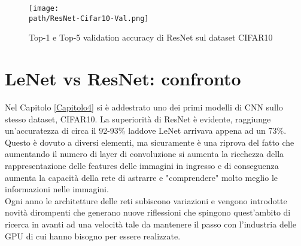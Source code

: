 \begin{figure}[h!]
 \centering
 \texttt{[image: \\path/ResNet-Cifar10-Val.png]} 
 \caption{Top-1 e Top-5 validation accuracy di ResNet sul dataset CIFAR10}
 \label{fig:res-val}
\end{figure}

\section{LeNet vs ResNet: confronto}
Nel Capitolo \ref{Capitolo4} si è addestrato uno dei primi modelli di CNN sullo stesso dataset, CIFAR10. La superiorità di ResNet è evidente, raggiunge un'accuratezza di circa il 92-93\% laddove LeNet arrivava appena ad un 73\%. \\
Questo è dovuto a diversi elementi, ma sicuramente è una riprova del fatto che aumentando il numero di layer di convoluzione si aumenta la ricchezza della rappresentazione delle features delle immagini in ingresso e di conseguenza aumenta la capacità della rete di astrarre e "comprendere" molto meglio le informazioni nelle immagini. \\
Ogni anno le architetture delle reti subiscono variazioni e vengono introdotte novità dirompenti che generano nuove riflessioni che spingono quest'ambito di ricerca in avanti ad una velocità tale da mantenere il passo con l'industria delle GPU di cui hanno bisogno per essere  realizzate. 



